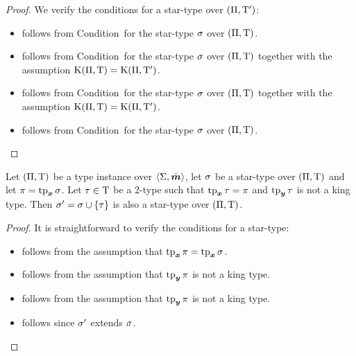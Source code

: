 \begin{proof}
We verify the conditions for a star-type over $(\Pi,{\mathrm{T}'})$:
\begin{itemize}
  \item[\refcondstpx]
  follows from Condition~ for the star-type $\sigma$ over
  $(\Pi,\mathrm{T})$.
  \item[\refcondstpkx]
  follows from Condition~ for the star-type $\sigma$ over
  $(\Pi,\mathrm{T})$ together with the assumption $\mathrm{K}(\Pi,\mathrm{T}) =
  \mathrm{K}(\Pi,{\mathrm{T}'})$.
  \item[\refcondstpky]
  follows from Condition~ for the star-type $\sigma$ over
  $(\Pi,\mathrm{T})$ together with the assumption $\mathrm{K}(\Pi,\mathrm{T}) =
  \mathrm{K}(\Pi,{\mathrm{T}'})$.
  \item[\refcondstpm]
  follows from Condition~ for the star-type $\sigma$ over
  $(\Pi,\mathrm{T})$.
\end{itemize}
\end{proof}

\begin{remark}\label{rem:star-type-ext}
Let $(\Pi,\mathrm{T})$ be a type instance over $\left\langle \mathrm{\Sigma},\bar{\bm{m}} \right\rangle$,
let $\sigma$ be a star-type over $(\Pi,\mathrm{T})$ and let $\pi = \operatorname{tp}_{\bm{x}}\sigma$.
Let $\tau \in \mathrm{T}$ be a $2$-type such that $\operatorname{tp}_{\bm{x}}\tau = \pi$ and
$\operatorname{tp}_{\bm{y}}\tau$ is not a king type.
Then ${\sigma'} = \sigma \cup \left\{\tau\right\}$ is also a star-type over
$(\Pi,\mathrm{T})$.
\end{remark}
\begin{proof}
It is straightforward to verify the conditions for a star-type:
\begin{itemize}
  \item[\refcondstpx] follows from the assumption that $\operatorname{tp}_{\bm{x}}\pi = \operatorname{tp}_{\bm{x}}\sigma$.
  \item[\refcondstpkx] follows from the assumption that $\operatorname{tp}_{\bm{y}}\pi$ is not a
  king type.
  \item[\refcondstpky] follows from the assumption that $\operatorname{tp}_{\bm{y}}\pi$ is not a
  king type.
  \item[\refcondstpm] follows since ${\sigma'}$ extends $\sigma$.
\end{itemize}
\end{proof}

